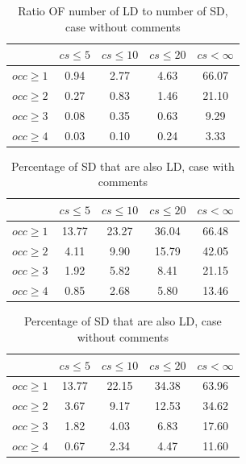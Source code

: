 \documentclass[conference]{IEEEtran}
\begin{document}
\begin{table}[!h]
\renewcommand{\arraystretch}{1.25}
\caption{Ratio OF number of LD to number of SD, case without comments}
\label{tab:ratio:nocomm}
\centering

\begin{tabular}{|c|c|c|c|c|}
\hline
	      &	$cs\leq 5$	&	$cs\leq 10$	&	$cs\leq 20$	&	$cs< \infty$	\\
\hline
$occ\geq 1$	&	0.94	&	2.77	&	4.63	&	66.07	\\
$occ\geq 2$	&	0.27	&	0.83	&	1.46	&	21.10	\\
$occ\geq 3$	&	0.08	&	0.35	&	0.63	&	9.29	\\
$occ\geq 4$	&	0.03	&	0.10	&	0.24	&	3.33	\\
\hline
\end{tabular}
\end{table}


\begin{table}[!h]
\renewcommand{\arraystretch}{1.25}
\caption{Percentage of SD that are also LD, case with comments}
\label{tab:percSD:comm}
\centering

\begin{tabular}{|c|c|c|c|c|}
\hline
	      &	$cs\leq 5$	&	$cs\leq 10$	&	$cs\leq 20$	&	$cs< \infty$	\\
\hline
$occ\geq 1$	&	13.77	&	23.27	&	36.04	&	66.48	\\
$occ\geq 2$	&	4.11	&	9.90	&	15.79	&	42.05	\\
$occ\geq 3$	&	1.92	&	5.82	&	8.41	&	21.15	\\
$occ\geq 4$	&	0.85	&	2.68	&	5.80	&	13.46	\\
\hline
\end{tabular}
\end{table}


\begin{table}[!h]
\renewcommand{\arraystretch}{1.25}
\caption{Percentage of SD that are also LD, case without comments}
\label{tab:percSD:nocomm}
\centering

\begin{tabular}{|c|c|c|c|c|}
\hline
	      &	$cs\leq 5$	&	$cs\leq 10$	&	$cs\leq 20$	&	$cs< \infty$	\\
\hline
$occ\geq 1$	&	13.77	&	22.15	&	34.38	&	63.96	\\
$occ\geq 2$	&	3.67	&	9.17	&	12.53	&	34.62	\\
$occ\geq 3$	&	1.82	&	4.03	&	6.83	&	17.60	\\
$occ\geq 4$	&	0.67	&	2.34	&	4.47	&	11.60	\\
\hline
\end{tabular}
\end{table}
\end{document}
